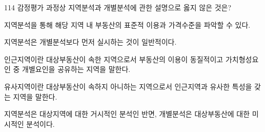 \begin{question}{114}
감정평가 과정상 지역분석과 개별분석에 관한 설명으로 옳지 않은 것은?
\begin{choices}
  \item 지역분석을 통해 해당 지역 내 부동산의 표준적 이용과 가격수준을 파악할 수 있다.
  \item 지역분석은 개별분석보다 먼저 실시하는 것이 일반적이다.
  \item 인근지역이란 대상부동산이 속한 지역으로서 부동산의 이용이 동질적이고 가치형성요인 중 개별요인을 공유하는 지역을 말한다.
  \item 유사지역이란 대상부동산이 속하지 아니하는 지역으로서 인근지역과 유사한 특성을 갖는 지역을 말한다.
  \item 지역분석은 대상지역에 대한 거시적인 분석인 반면, 개별분석은 대상부동산에 대한 미시적인 분석이다.
\end{choices}
\end{question}
